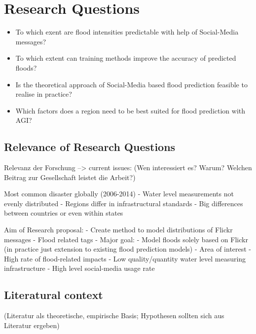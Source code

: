 \section{Research Questions}
\begin{itemize}
\item To which exent are flood intensities predictable with help of Social-Media messages? 
\item To which extent can training methods improve the accuracy of predicted floods?
\item Is the theoretical approach of Social-Media based flood prediction feasible to realise in practice? 
\item Which factors does a region need to be best suited for flood prediction with AGI?
\end{itemize}

\subsection{Relevance of Research Questions}
Relevanz der Forschung --> current issues:  (Wen interessiert es? Warum? Welchen Beitrag zur Gesellschaft leistet die Arbeit?)

Most common disaster globally (2006-2014)
- Water level measurements not evenly distributed
- Regions differ in infrastructural standards
- Big differences between countries or even within states

Aim of Research proposal:
- Create method to model distributions of Flickr messages
- Flood related tags
- Major goal:
- Model floods solely based on Flickr (in practice just extension to existing flood 
prediction models)
- Area of interest
	- High rate of flood-related impacts
	- Low quality/quantity water level measuring infrastructure
	- High level social-media usage rate
	
\subsection{Literatural context}
(Literatur als theoretische, empirische Basis; Hypothesen sollten sich aus Literatur ergeben)